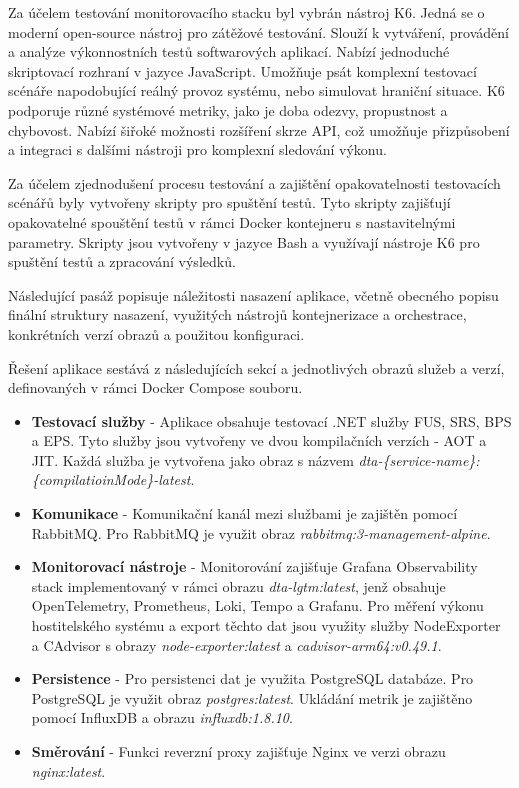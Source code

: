 
Za účelem testování monitorovacího stacku byl vybrán nástroj K6. Jedná se o moderní open-source nástroj pro zátěžové testování. Slouží k vytváření, provádění a analýze výkonnostních testů softwarových aplikací. Nabízí jednoduché skriptovací rozhraní v jazyce JavaScript. Umožňuje psát komplexní testovací scénáře napodobující reálný provoz systému, nebo simulovat hraniční situace. K6 podporuje různé systémové metriky, jako je doba odezvy, propustnost a chybovost. Nabízí šiřoké možnosti rozšíření skrze API, což umožňuje přizpůsobení a integraci s dalšími nástroji pro komplexní sledování výkonu.

Za účelem zjednodušení procesu testování a zajištění opakovatelnosti testovacích scénářů byly vytvořeny skripty pro spuštění testů. Tyto skripty zajišťují opakovatelné spouštění testů v rámci Docker kontejneru s nastavitelnými parametry. Skripty jsou vytvořeny v jazyce Bash a využívají nástroje K6 pro spuštění testů a zpracování výsledků.


Následující pasáž popisuje náležitosti nasazení aplikace, včetně obecného popisu finální struktury nasazení, využitých nástrojů kontejnerizace a orchestrace, konkrétních verzí obrazů a použitou konfiguraci.


Řešení aplikace sestává z následujících sekcí a jednotlivých obrazů služeb a verzí, definovaných v rámci Docker Compose souboru.

\begin{itemize}
    \item \textbf{Testovací služby} - Aplikace obsahuje testovací .NET služby FUS, SRS, BPS a EPS. Tyto služby jsou vytvořeny ve dvou kompilačních verzích - AOT a JIT. Každá služba je vytvořena jako obraz s názvem \emph{dta-\{service-name\}:\{compilatioinMode\}-latest}.
    \item \textbf{Komunikace} - Komunikační kanál mezi službami je zajištěn pomocí RabbitMQ. Pro RabbitMQ je využit obraz \emph{rabbitmq:3-management-alpine}.
    \item \textbf{Monitorovací nástroje} - Monitorování zajišťuje Grafana Observability stack implementovaný v rámci obrazu \emph{dta-lgtm:latest}, jenž obsahuje OpenTelemetry, Prometheus, Loki, Tempo a Grafanu. Pro měření výkonu hostitelského systému a export těchto dat jsou využity služby NodeExporter a CAdvisor s obrazy \emph{node-exporter:latest} a \emph{cadvisor-arm64:v0.49.1}.
    \item \textbf{Persistence} - Pro persistenci dat je využita PostgreSQL databáze. Pro PostgreSQL je využit obraz \emph{postgres:latest}. Ukládání metrik je zajištěno pomocí InfluxDB a obrazu \emph{influxdb:1.8.10}.
    \item \textbf{Směrování} - Funkci reverzní proxy zajišťuje Nginx ve verzi obrazu \emph{nginx:latest}.
\end{itemize}

